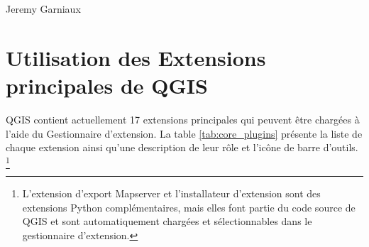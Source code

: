 \item [Traducteur :] Jeremy Garniaux

\section{Utilisation des Extensions principales de QGIS}\label{sec:core_plugins}



QGIS contient actuellement 17 extensions principales qui peuvent \^etre charg\'ees \`a l'aide du Gestionnaire d'extension.
La table \ref{tab:core_plugins} pr\'esente la liste de chaque extension ainsi qu'une 
description de leur r\^ole et l'ic\^one de barre d'outils. \footnote{L'extension d'export 
Mapserver et l'installateur d'extension sont des extensions Python compl\'ementaires, 
mais elles font partie du code source de QGIS et sont automatiquement charg\'ees et s\'electionnables 
dans le gestionnaire d'extension.}


